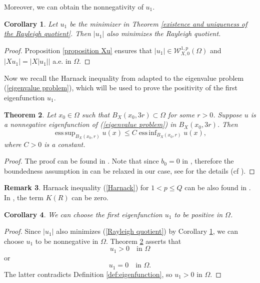 \documentclass[a4paper,12pt,reqno]{amsart}
\renewcommand\eqref[1]{(\ref{#1})} %
\numberwithin{equation}{section}
\theoremstyle{plain}
\newtheorem{theorem}{Theorem}[section]
\newtheorem{corollary}[theorem]{Corollary}
\theoremstyle{definition}
\newtheorem{remark}[theorem]{Remark}
\DeclareMathOperator*{\esssup}{ess\,sup}
\DeclareMathOperator*{\essinf}{ess\,inf}
\begin{document}
Moreover, we can obtain the nonnegativity of $u_{1}$.
\begin{corollary}\label{|u_1| minimizes}
Let $u_{1}$ be the minimizer in Theorem \ref{existence and uniqueness of the Rayleigh quotient}. Then $|u_{1}|$ also minimizes the Rayleigh quotient.
\end{corollary}
\begin{proof}
Proposition \ref{proposition Xu} ensures that $|u_{1}| \in \mathcal{W}_{X,0}^{1, p}(\Omega)$ and  $|Xu_{1}|=|X|u_{1}||$  a.e. in $\Omega$.
\end{proof}
Now we recall the Harnack inequality from \cite{Lu1996} adapted to the eigenvalue problem \eqref{eigenvalue problem}, which will be used to prove the positivity of the first eigenfunction $u_{1}$.
\begin{theorem}\label{Harnack inequality}
Let $x_{0}\in\Omega$ such that $B_{X}(x_0, 3r)\subset \Omega$ for some $r>0$. Suppose $u$ is a nonnegative eigenfunction of \eqref{eigenvalue problem} in  $B_{X}(x_0, 3r)$. Then
\begin{equation}\label{Harnack}
\esssup _{B_{X}(x_0, r)} u(x) \leq C \essinf _{B_{X}(x_0, r)} u(x),
\end{equation}
where $C>0$ is a constant.
\end{theorem}
\begin{proof}
The proof can be found in \cite[Corollary 3.11]{Lu1996}. Note that since $b_0=0$ in \cite[(3.1) formula, p. 314]{Lu1996}, therefore the boundedness assumption in \cite[Corollary 3.11]{Lu1996} can be relaxed in our case, see \cite[p. 318]{Lu1996} for the details (cf \cite[p. 724]{Trudinger1967}).
\end{proof}
\begin{remark}
Harnack inequality \eqref{Harnack} for $1<p\leq Q$ can be also found in \cite[Theorem 3.1]{capogna1993embedding}. In \cite[Theorem 3.1]{capogna1993embedding}, the term $K(R)$ can be zero.
\end{remark}




\begin{corollary}\label{positivity of the first eigenfuncion}
We can choose the first eigenfunction $u_{1}$ to be positive in $\Omega$.
\end{corollary}
\begin{proof}
Since $|u_{1}|$ also minimizes \eqref{Rayleigh quotient} by Corollary \ref{|u_1| minimizes}, we can choose $u_{1}$ to be nonnegative in $\Omega$. Theorem \ref{Harnack inequality} asserts that 
$$u_{1}>0 \quad \text{in } \Omega$$ 
or 
$$u_{1} = 0 \quad \text{in } \Omega.$$  
The latter  contradicts Definition \ref{def:eigenfunction}, so  $u_{1}>0$ in $\Omega$. 
\end{proof}
\end{document}

